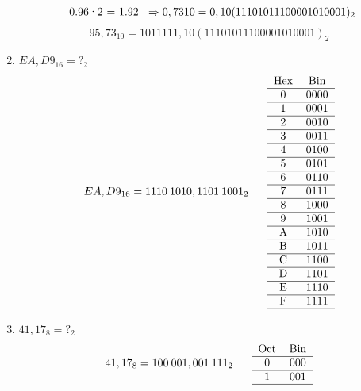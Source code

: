 \documentclass{article}
\begin{document}
\begin{enumerate}
$$\begin{tabular}{c}
            0.96·2 = 1.92 \\
          \end{tabular}
          \Rightarrow
          0,73{10} = 0,10(11101011100001010001)_{2}
        $$ $$
          95,73_{10} = 1011111,10(11101011100001010001)_{2}
        $$
  \item $ EA,D9_{16}       = ?_{2}$
        $$
          EA,D9_{16}       = 1110\:1010,1101\:1001_{2}
          \;\;\;\;\;\;\;\\
          \begin{tabular}{cc}
            Hex & Bin  \\
            \hline
            0   & 0000 \\
            \hline
            1   & 0001 \\
            \hline
            2   & 0010 \\
            \hline
            3   & 0011 \\
            \hline
            4   & 0100 \\
            \hline
            5   & 0101 \\
            \hline
            6   & 0110 \\
            \hline
            7   & 0111 \\
            \hline
            8   & 1000 \\
            \hline
            9   & 1001 \\
            \hline
            A   & 1010 \\
            \hline
            B   & 1011 \\
            \hline
            C   & 1100 \\
            \hline
            D   & 1101 \\
            \hline
            E   & 1110 \\
            \hline
            F   & 1111 \\
            \hline
          \end{tabular}
        $$
  \item $ 41,17_{8}        = ?_{2}$
        $$
          41,17_{8}       = 100\:001,001\:111_{2}
          \;\;\;\;\;\;\;\\
          \begin{tabular}{cc}
            Oct & Bin \\
            \hline
            0   & 000 \\
            \hline
            1   & 001 \\
            \hline

\end{tabular}$$
\end{enumerate}
\end{document}
